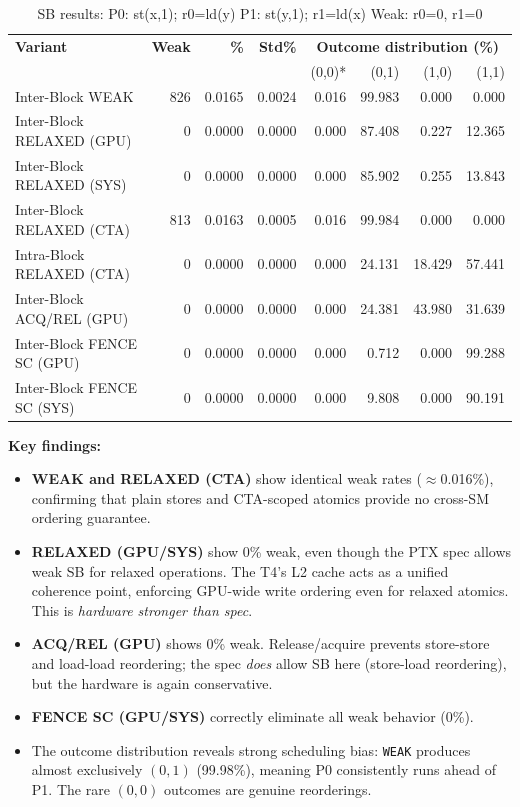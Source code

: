 \documentclass[a4paper]{article}
\begin{document}
\begin{table}[H]
\centering
\small
\caption{SB results: P0: st(x,1); r0=ld(y) \quad P1: st(y,1); r1=ld(x) \quad Weak: r0=0, r1=0}
\label{tab:sb-results}
\begin{tabular}{l|r r r | r r r r}
\toprule
\textbf{Variant} & \textbf{Weak} & \textbf{\%} & \textbf{Std\%} & \multicolumn{4}{c}{\textbf{Outcome distribution (\%)}} \\
                 &               &             &                & (0,0)* & (0,1) & (1,0) & (1,1) \\
\midrule
Inter-Block WEAK          &   826 & 0.0165 & 0.0024 & 0.016 & 99.983 & 0.000 & 0.000 \\
Inter-Block RELAXED (GPU) &     0 & 0.0000 & 0.0000 & 0.000 & 87.408 & 0.227 & 12.365 \\
Inter-Block RELAXED (SYS) &     0 & 0.0000 & 0.0000 & 0.000 & 85.902 & 0.255 & 13.843 \\
Inter-Block RELAXED (CTA) &   813 & 0.0163 & 0.0005 & 0.016 & 99.984 & 0.000 & 0.000 \\
Intra-Block RELAXED (CTA) &     0 & 0.0000 & 0.0000 & 0.000 & 24.131 & 18.429 & 57.441 \\
Inter-Block ACQ/REL (GPU) &     0 & 0.0000 & 0.0000 & 0.000 & 24.381 & 43.980 & 31.639 \\
Inter-Block FENCE SC (GPU)&     0 & 0.0000 & 0.0000 & 0.000 &  0.712 &  0.000 & 99.288 \\
Inter-Block FENCE SC (SYS)&     0 & 0.0000 & 0.0000 & 0.000 &  9.808 &  0.000 & 90.191 \\
\bottomrule
\end{tabular}
\end{table}

\textbf{Key findings:}
\begin{itemize}
  \item \textbf{WEAK and RELAXED (CTA)} show identical weak rates ($\approx$0.016\%), confirming that plain stores and CTA-scoped atomics provide no cross-SM ordering guarantee.
  \item \textbf{RELAXED (GPU/SYS)} show 0\% weak, even though the PTX spec allows weak SB for relaxed operations. The T4's L2 cache acts as a unified coherence point, enforcing GPU-wide write ordering even for relaxed atomics. This is \emph{hardware stronger than spec}.
  \item \textbf{ACQ/REL (GPU)} shows 0\% weak. Release/acquire prevents store-store and load-load reordering; the spec \emph{does} allow SB here (store-load reordering), but the hardware is again conservative.
  \item \textbf{FENCE SC (GPU/SYS)} correctly eliminate all weak behavior (0\%).
  \item The outcome distribution reveals strong scheduling bias: \texttt{WEAK} produces almost exclusively $(0,1)$ (99.98\%), meaning P0 consistently runs ahead of P1. The rare $(0,0)$ outcomes are genuine reorderings.
\end{itemize}
\end{document}
